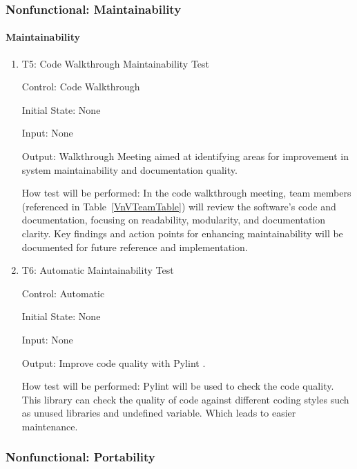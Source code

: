 \documentclass[12pt, titlepage]{article}
\begin{document}
\subsubsection{Nonfunctional: Maintainability} \label{NFMaintainablity}
		
\paragraph{Maintainability}

\begin{enumerate}

  \item{T5: Code Walkthrough Maintainability Test\\}

  Control: Code Walkthrough
  
  Initial State: None
  
  Input: None
  
  Output: Walkthrough Meeting aimed at identifying areas for improvement in 
  system maintainability and documentation quality.

  How test will be performed: In the code walkthrough meeting, team members 
  (referenced in Table~\ref{VnVTeamTable}) will review the software's code and documentation, 
  focusing on readability, modularity, and documentation clarity. Key findings and action 
  points for enhancing maintainability will be documented for future reference and implementation.

  \item{T6: Automatic Maintainability Test\\}

  Control: Automatic
  
  Initial State: None
  
  Input: None
  
  Output: Improve code quality with Pylint \cite{pylint}.

  How test will be performed: Pylint \cite{pylint} will be used to check the code quality.
  This library can check the quality of code against different coding styles such as unused libraries
  and undefined variable. Which leads to easier maintenance.
\end{enumerate}

\subsubsection{Nonfunctional: Portability} \label{NFPortablity}
		
\end{document}
